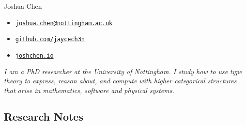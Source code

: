 \documentclass[12pt,a4paper]{article}
\author{}
\date{}
\providecommand{\tightlist}{%
  \setlength{\itemsep}{0pt}\setlength{\parskip}{0pt}}
\begin{document}
\newcommand{\httpsurl}[1]{\href{https://#1}{\nolinkurl{#1}}}

\thispagestyle{fancy}

{\sc\huge Joshua Chen}
\vspace{1.5ex}
\begin{itemize}
\tightlist
\item[\small\faPaperPlane] \href{mailto:joshua.chen@nottingham.ac.uk}{\nolinkurl{joshua.chen@nottingham.ac.uk}}
\item[\small\faGithub] \httpsurl{github.com/jaycech3n}
\item[\small\faGlobeEurope] \httpsurl{joshchen.io}
\end{itemize}
\vspace{1.5ex}
\textit{I am a PhD researcher at the University of Nottingham.
I study how to use type theory to express, reason about, and compute with higher categorical structures that arise in mathematics, software and physical systems.}

\subsection{Research Notes}

\newcommand{\pdficon}{{\scriptsize\faFilePdf[regular]}}
\newcommand{\pdf}[1]{\pdficon\hspace{0.8ex}\httpsurl{#1}}
\end{document}
